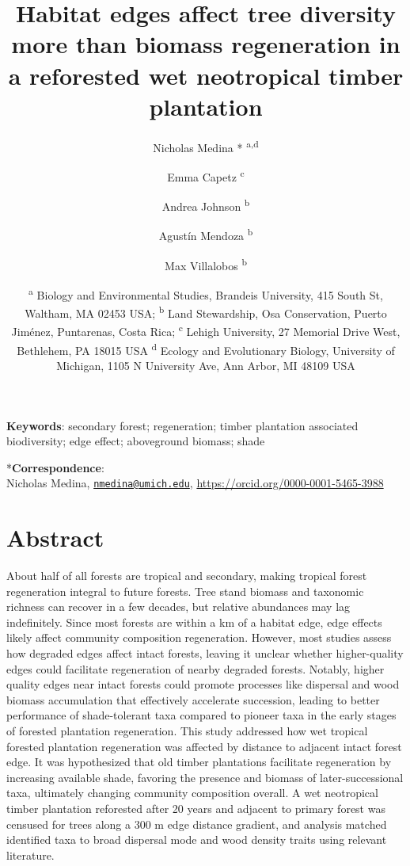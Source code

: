 \documentclass[
  12pt,
]{article}
\title{Habitat edges affect tree diversity more than biomass regeneration in a reforested wet neotropical timber plantation}
\author{Nicholas Medina * \textsuperscript{a,d} \and Emma Capetz \textsuperscript{c} \and Andrea Johnson \textsuperscript{b} \and Agustín Mendoza \textsuperscript{b} \and Max Villalobos \textsuperscript{b}}
\date{\scriptsize \textsuperscript{a} Biology and Environmental Studies, Brandeis University, 415 South St, Waltham, MA 02453 USA; \textsuperscript{b} Land Stewardship, Osa Conservation, Puerto Jiménez, Puntarenas, Costa Rica; \textsuperscript{c} Lehigh University, 27 Memorial Drive West, Bethlehem, PA 18015 USA \textsuperscript{d} Ecology and Evolutionary Biology, University of Michigan, 1105 N University Ave, Ann Arbor, MI 48109 USA}
\begin{document}
\maketitle

\hfill\break
\hfill\break

\textbf{Keywords}:
secondary forest;
regeneration;
timber plantation associated biodiversity;
edge effect;
aboveground biomass;
shade

\hfill\break
\hfill\break

*\textbf{Correspondence}:\\
Nicholas Medina, \href{mailto:nmedina@umich.edu}{\nolinkurl{nmedina@umich.edu}}, \url{https://orcid.org/0000-0001-5465-3988}

\newpage

\hypertarget{abstract}{%
\section*{Abstract}\label{abstract}}

About half of all forests are tropical and secondary, making tropical forest regeneration integral to future forests.
Tree stand biomass and taxonomic richness can recover in a few decades, but relative abundances may lag indefinitely.
Since most forests are within a km of a habitat edge, edge effects likely affect community composition regeneration.
However, most studies assess how degraded edges affect intact forests, leaving it unclear whether higher-quality edges could facilitate regeneration of nearby degraded forests.
Notably, higher quality edges near intact forests could promote processes like dispersal and wood biomass accumulation that effectively accelerate succession, leading to better performance of shade-tolerant taxa compared to pioneer taxa in the early stages of forested plantation regeneration.
This study addressed how wet tropical forested plantation regeneration was affected by distance to adjacent intact forest edge.
It was hypothesized that old timber plantations facilitate regeneration by increasing available shade, favoring the presence and biomass of later-successional taxa, ultimately changing community composition overall.
A wet neotropical timber plantation reforested after 20 years and adjacent to primary forest was censused for trees along a 300 m edge distance gradient, and analysis matched identified taxa to broad dispersal mode and wood density traits using relevant literature.
\end{document}
